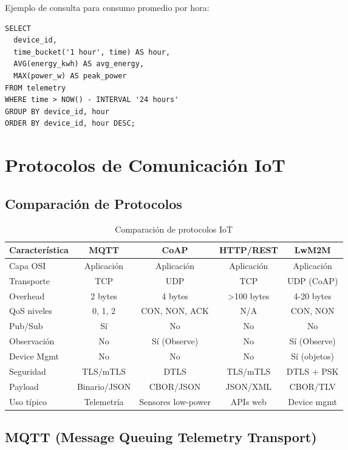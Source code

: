 Ejemplo de consulta para consumo promedio por hora:

\begin{verbatim}
SELECT 
  device_id,
  time_bucket('1 hour', time) AS hour,
  AVG(energy_kwh) AS avg_energy,
  MAX(power_w) AS peak_power
FROM telemetry
WHERE time > NOW() - INTERVAL '24 hours'
GROUP BY device_id, hour
ORDER BY device_id, hour DESC;
\end{verbatim}

\section{Protocolos de Comunicación IoT}

\subsection{Comparación de Protocolos}

\begin{table}[h]
\centering
\small
\begin{tabular}{|l|c|c|c|c|}
\hline
\textbf{Característica} & \textbf{MQTT} & \textbf{CoAP} & \textbf{HTTP/REST} & \textbf{LwM2M} \\
\hline
Capa OSI & Aplicación & Aplicación & Aplicación & Aplicación \\
Transporte & TCP & UDP & TCP & UDP (CoAP) \\
Overhead & 2 bytes & 4 bytes & >100 bytes & 4-20 bytes \\
QoS niveles & 0, 1, 2 & CON, NON, ACK & N/A & CON, NON \\
Pub/Sub & Sí & No & No & No \\
Observación & No & Sí (Observe) & No & Sí (Observe) \\
Device Mgmt & No & No & No & Sí (objetos) \\
Seguridad & TLS/mTLS & DTLS & TLS/mTLS & DTLS + PSK \\
Payload & Binario/JSON & CBOR/JSON & JSON/XML & CBOR/TLV \\
Uso típico & Telemetría & Sensores low-power & APIs web & Device mgmt \\
\hline
\end{tabular}
\caption{Comparación de protocolos IoT}
\end{table}

\subsection{MQTT (Message Queuing Telemetry Transport)}

